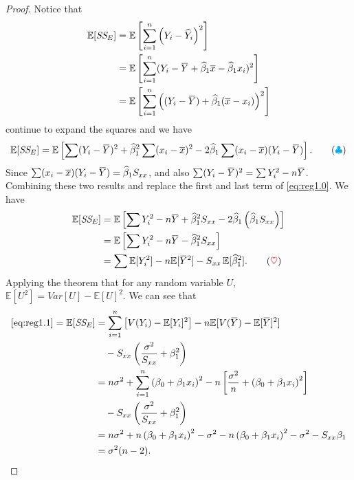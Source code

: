 \begin{proof}
    Notice that
    \begin{align*}
        \mathbb{E}[\CS{E}] &= \mathbb{E} \left[ \sum_{i=1}^{n} \left(Y_i - \widehat{Y}_i\right)^2 \right]\\
        &= \mathbb{E} \left[ \sum_{i=1}^{n} (Y_i - \ols{Y} + \widehat{\beta}_1 \overline{x} - \widehat{\beta}_1 x_i)^2  \right]\\
        &= \mathbb{E} \left[ \sum_{i=1}^{n} \left((Y_i - \ols{Y}) + \widehat{\beta}_1 (\overline{x} - x_i) \right)^2  \right]\\
    \end{align*}
    continue to expand the squares and we have 
    \[
        \mathbb{E}[\CS{E}]
        = \mathbb{E} \left[ \sum (Y_i - \ols{Y})^2 + \widehat{\beta}_1^2 \sum (x_i - \overline{x})^2 - 2\widehat{\beta}_1 \sum (x_i - \overline{x})(Y_i - \ols{Y}) \right]. 
        \label{eq:reg1.0} \tag{{\color{cyan} $\clubsuit$}}
    \]
    Since $\sum (x_i - \overline{x})(Y_i - \ols{Y}) = \widehat{\beta}_1 S_{xx}$, and also $\sum (Y_i - \ols{Y})^2 = \sum Y_i^2 - n\ols{Y}$. Combining these two 
    results and replace the first and last term of \eqref{eq:reg1.0}. We have 
    \begin{align*}
        \mathbb{E}[\CS{E}] &= \mathbb{E} \left[ \sum Y_i^2 - n\ols{Y} + \widehat{\beta}^2_1 S_{xx} - 2 \widehat{\beta}_1 \left(\widehat{\beta}_1 S_{xx}\right) \right]\\
        &= \mathbb{E} \left[ \sum Y_i^2 - n\ols{Y} - \widehat{\beta}^2_1 S_{xx} \right]\\
        &= \sum \mathbb{E}[Y_i^2] - n \mathbb{E} [\ols{Y}^2] - S_{xx} \, \mathbb{E}[\widehat{\beta}^2_1]. \label{eq:reg1.1} \tag{{\color{red} $\heartsuit $}}
    \end{align*}
    Applying the theorem that for any random variable $U$, $\mathbb{E}[U^2] = Var[U] - \mathbb{E}[U]^2$. We can see that 
    \begin{align*}
        \eqref{eq:reg1.1} = \mathbb{E}[\CS{E}] &= \sum^n_{i=1} \left[ V(Y_i) - \mathbb{E}[Y_i]^2 \right] - n \mathbb{E} [V(\ols{Y}) - \mathbb{E}[\ols{Y}]^2] \\
        &\quad - S_{xx} \left( \frac{\sigma^2}{S_{xx}} + \beta^2_1 \right)\\
        &= n\sigma^2 + \sum^n_{i=1} \left(\beta_0 + \beta_1 x_i \right)^2 - n \left[ \frac{\sigma^2}{n} + \left(\beta_0 + \beta_1 x_i \right)^2 \right]\\
        &\quad - S_{xx} \left( \frac{\sigma^2}{S_{xx}} + \beta^2_1 \right)\\
        &= n\sigma^2 + n\left(\beta_0 + \beta_1 x_i \right)^2 - \sigma^2 - n\left(\beta_0 + \beta_1 x_i \right)^2 - \sigma^2 - S_{xx}\beta_1\\
        &= \sigma^2(n-2).
    \end{align*}
\end{proof}

